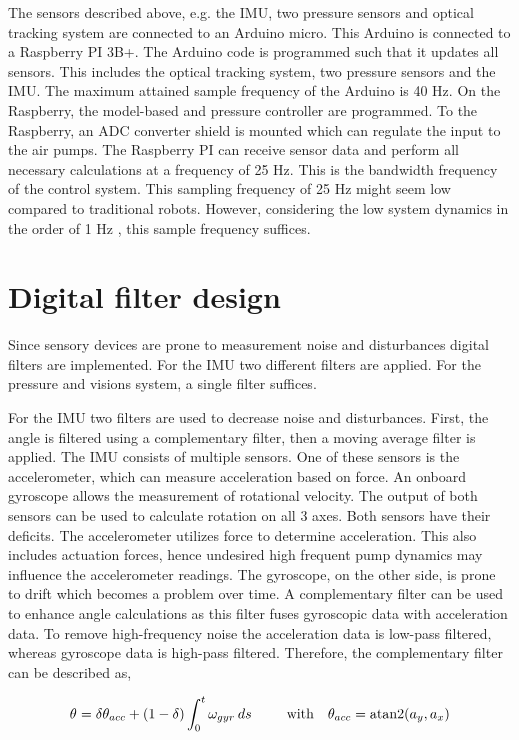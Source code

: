 The sensors described above, e.g. the IMU, two pressure sensors and optical tracking system are connected to an Arduino micro. This Arduino is connected to a Raspberry PI 3B+. The Arduino code is programmed such that it updates all sensors. This includes the optical tracking system, two pressure sensors and the IMU. The maximum attained sample frequency of the Arduino is 40 Hz. On the Raspberry, the model-based and pressure controller are programmed. To the Raspberry, an ADC converter shield is mounted which can regulate the input to the air pumps. The Raspberry PI can receive sensor data and perform all necessary calculations at a frequency of 25 Hz. This is the bandwidth frequency of the control system. This sampling frequency of 25 Hz might seem low compared to traditional robots. However, considering the low system dynamics in the order of 1 Hz \cite{tawk2018bioinspired},\cite{HighBandwidthControl} this sample frequency suffices.  

\section{Digital filter design}

Since sensory devices are prone to measurement noise and disturbances digital filters are implemented. For the IMU two different filters are applied. For the pressure and visions system, a single filter suffices. 

For the IMU two filters are used to decrease noise and disturbances. First, the angle is filtered using a complementary filter, then a moving average filter is applied. The IMU consists of multiple sensors. One of these sensors is the accelerometer, which can measure acceleration based on force. An onboard gyroscope allows the measurement of rotational velocity. The output of both sensors can be used to calculate rotation on all 3 axes. Both sensors have their deficits. The accelerometer utilizes force to determine acceleration. This also includes actuation forces, hence undesired high frequent pump dynamics may influence the accelerometer readings. The gyroscope, on the other side, is prone to drift which becomes a problem over time. A complementary filter can be used to enhance angle calculations as this filter fuses gyroscopic data with acceleration data. To remove high-frequency noise the acceleration data is low-pass filtered, whereas gyroscope data is high-pass filtered. Therefore, the complementary filter can be described as, 

\begin{equation}
    \theta_{} = \delta \theta_{acc} + (1-\delta) \int_0^t \omega_{gyr} \hspace{2pt} ds    \hspace{25pt} \text{with}  \hspace{10pt} \theta_{acc} = \operatorname{atan2}(a_y,a_x)
\end{equation}

